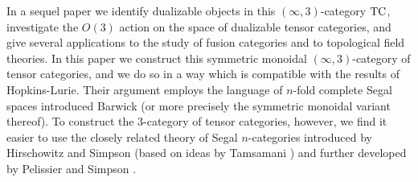 \documentclass{amsart}
\begin{document}
In a sequel paper \cite{DSPS} we identify dualizable objects in this $(\infty, 3)$-category $\mathrm{TC}$, investigate the $O(3)$ action on the space of dualizable tensor categories, and give several applications to the study of fusion categories and to topological field theories.  In this paper we construct this symmetric monoidal $(\infty,3)$-category of tensor categories, and we do so in a way which is compatible with the results of Hopkins-Lurie.  Their argument employs the language of $n$-fold complete Segal spaces introduced Barwick \cite{Barwick:thesis} (or more precisely the symmetric monoidal variant thereof). To construct the 3-category of tensor categories, however, we find it easier to use the closely related theory of Segal $n$-categories introduced by Hirschowitz and Simpson \cite{9807049} (based on ideas by Tamsamani \cite{Tamsamani:thesis}) and further developed by Pelissier \cite{Pelissier:thesis} and Simpson \cite{1001.4071}.


\end{document}
